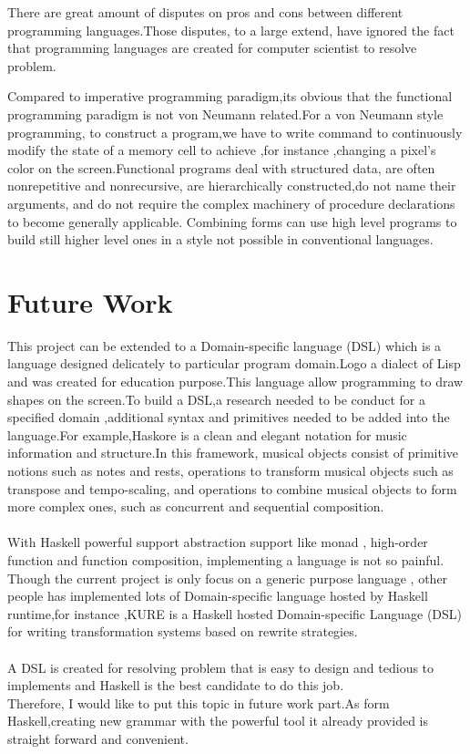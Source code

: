 There are great amount of disputes on pros and cons between different programming languages.Those disputes, to a large extend, have ignored the fact that programming languages are created for computer scientist to resolve problem.


Compared to imperative programming paradigm,its obvious that the functional programming paradigm is not von Neumann related.For a von Neumann style programming, to construct a program,we have to write command to continuously modify the state of a memory cell to achieve ,for instance ,changing a pixel's color on the screen.Functional programs deal with structured
data, are often nonrepetitive and nonrecursive, are hierarchically constructed,do not name their arguments, and do not require the complex machinery of procedure declarations to become generally applicable. Combining
forms can use high level programs to build still higher level ones in a style not possible in conventional languages.\cite{liberate}


\section{Future Work}
This project can be extended to a Domain-specific language (DSL) which is a language designed delicately to particular program domain.Logo a dialect of Lisp and was created for education purpose.This language allow programming to draw shapes on the screen.To build a DSL,a research needed to be conduct for a specified domain ,additional syntax and primitives needed to be added into the language.For example,Haskore is a clean and elegant notation for music information and structure.In this framework, musical objects consist of primitive notions such as notes and rests, operations to transform musical objects such as transpose and tempo-scaling, and operations to combine musical objects to form more complex ones, such as concurrent and sequential composition. \cite{music}
 \\\\
With Haskell powerful support abstraction support like monad , high-order function and function composition, implementing a language is not so painful.
Though the current project is only focus on a generic purpose language , other people has implemented lots of  Domain-specific language hosted by Haskell runtime,for instance ,KURE is a Haskell hosted Domain-specific Language (DSL) for writing transformation systems based on rewrite strategies.\cite{hosted}\\\\
A DSL is created for resolving problem that is easy to design and tedious to implements and Haskell is the best candidate to do this job.\\

Therefore, I would like to put this topic in  future work part.As form Haskell,creating new grammar with the powerful tool it already provided is straight forward and convenient.
 